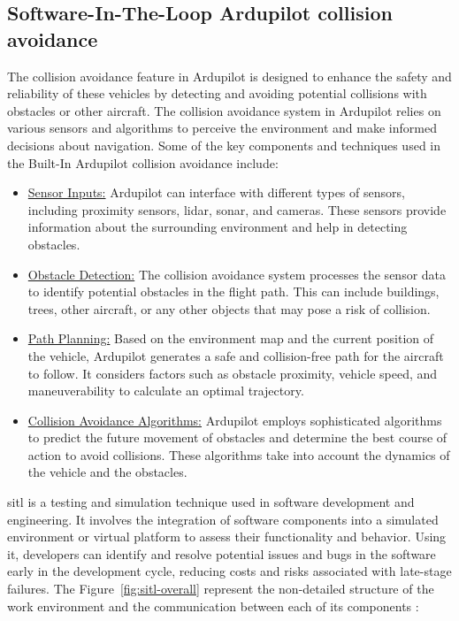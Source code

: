 \subsection{Software-In-The-Loop Ardupilot collision avoidance}
The collision avoidance feature in Ardupilot is designed to enhance the safety and reliability of these vehicles by detecting and avoiding potential collisions with obstacles or other aircraft.
\break
The collision avoidance system in Ardupilot relies on various sensors and algorithms to perceive the environment and make informed decisions about navigation. Some of the key components and techniques used in the Built-In Ardupilot collision avoidance include:

\begin{itemize}
    \item \underline{Sensor Inputs:} Ardupilot can interface with different types of sensors, including proximity sensors, \gls{lidar}, sonar, and cameras. These sensors provide information about the surrounding environment and help in detecting obstacles.
    \item \underline{Obstacle Detection:} The collision avoidance system processes the sensor data to identify potential obstacles in the flight path. This can include buildings, trees, other aircraft, or any other objects that may pose a risk of collision.
    \item \underline{Path Planning:} Based on the environment map and the current position of the vehicle, Ardupilot generates a safe and collision-free path for the aircraft to follow. It considers factors such as obstacle proximity, vehicle speed, and maneuverability to calculate an optimal trajectory.
    \item \underline{Collision Avoidance Algorithms:} Ardupilot employs sophisticated algorithms to predict the future movement of obstacles and determine the best course of action to avoid collisions. These algorithms take into account the dynamics of the vehicle and the obstacles.
\end{itemize}
\hfill \break
\gls{sitl} is a testing and simulation technique used in software development and engineering. It involves the integration of software components into a simulated environment or virtual platform to assess their functionality and behavior.
Using it, developers can identify and resolve potential issues and bugs in the software early in the development cycle, reducing costs and risks associated with late-stage failures.
\hfill \break
The Figure~\ref{fig:sitl-overall} represent the non-detailed structure of the work environment and the communication between each of its components :

